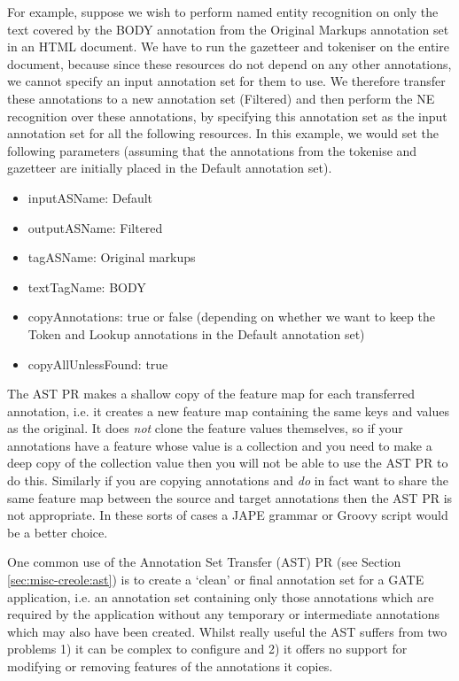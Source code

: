 %
For example, suppose we wish to perform named entity recognition on
only the text covered by the BODY annotation from the Original Markups
annotation set in an HTML document. We have to run the gazetteer and
tokeniser on the entire document, because since these resources do not
depend on any other annotations, we cannot specify an input annotation
set for them to use. We therefore transfer these annotations to a new
annotation set (Filtered) and then perform the NE recognition over these
annotations, by specifying this annotation set as the input annotation set
for all the following resources. In this example, we would set the following
parameters (assuming that the annotations from the tokenise and
gazetteer are initially placed in the Default annotation set).
\begin{itemize}
\item inputASName: Default
\item outputASName: Filtered
\item tagASName: Original markups
\item textTagName: BODY
\item copyAnnotations: true or false (depending on whether we want to keep
the Token and Lookup annotations in the Default annotation set)
\item copyAllUnlessFound: true
\end{itemize}

The AST PR makes a shallow copy of the feature map for each transferred
annotation, i.e. it creates a new feature map containing the same keys and
values as the original.  It does \emph{not} clone the feature values
themselves, so if your annotations have a feature whose value is a collection
and you need to make a deep copy of the collection value then you will not be
able to use the AST PR to do this.  Similarly if you are copying annotations
and \emph{do} in fact want to share the same feature map between the source and
target annotations then the AST PR is not appropriate.  In these sorts of cases
a JAPE grammar or Groovy script would be a better choice.




One common use of the Annotation Set Transfer (AST) PR (see Section \ref{sec:misc-creole:ast})
is to create a `clean' or final annotation set for a GATE application, i.e. an annotation set containing
only those annotations which are required by the application without any temporary or intermediate
annotations which may also have been created. Whilst really useful the AST suffers from two
problems 1) it can be complex to configure and 2) it offers no support for modifying or removing
features of the annotations it copies.

